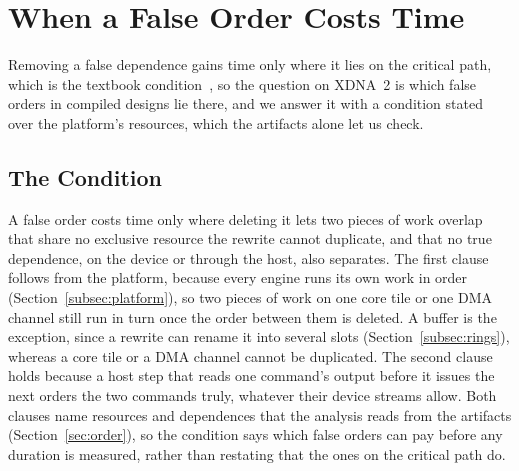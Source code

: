 \section{When a False Order Costs Time}
\label{sec:condition}

Removing a false dependence gains time only where it lies on the critical path, which is the textbook condition~\citep{fields2003interaction}, so the question on XDNA~2 is which false orders in compiled designs lie there, and we answer it with a condition stated over the platform's resources, which the artifacts alone let us check.

\subsection{The Condition}
\label{subsec:clause}

A false order costs time only where deleting it lets two pieces of work overlap that share no exclusive resource the rewrite cannot duplicate, and that no true dependence, on the device or through the host, also separates.
The first clause follows from the platform, because every engine runs its own work in order (Section~\ref{subsec:platform}), so two pieces of work on one core tile or one DMA channel still run in turn once the order between them is deleted.
A buffer is the exception, since a rewrite can rename it into several slots (Section~\ref{subsec:rings}), whereas a core tile or a DMA channel cannot be duplicated.
The second clause holds because a host step that reads one command's output before it issues the next orders the two commands truly, whatever their device streams allow.
Both clauses name resources and dependences that the analysis reads from the artifacts (Section~\ref{sec:order}), so the condition says which false orders can pay before any duration is measured, rather than restating that the ones on the critical path do.

